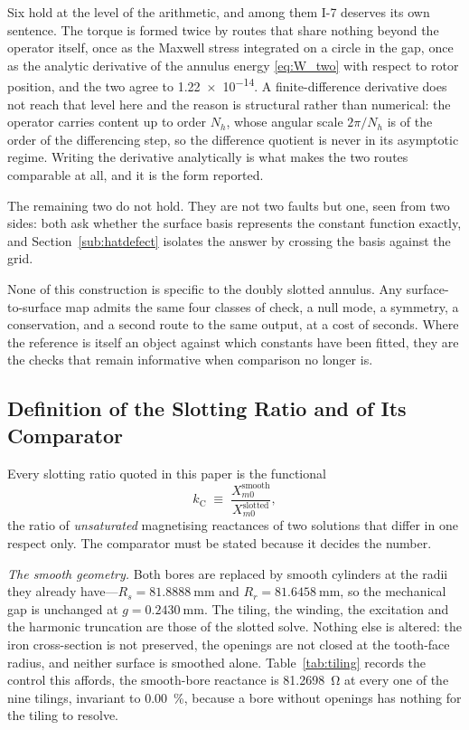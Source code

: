 \documentclass[10pt,a4paper,twocolumn]{article}
\theoremstyle{plain}
\theoremstyle{remark}
\begin{document}
Six hold at the level of the arithmetic, and among them I-7 deserves its
own sentence. The torque is formed twice by routes that share nothing
beyond the operator itself, once as the Maxwell stress integrated on a
circle in the gap, once as the analytic derivative of the annulus energy
\eqref{eq:W_two} with respect to rotor position, and the two agree to
\num{1.22e-14}. A finite-difference derivative does not reach that level
here and the reason is structural rather than numerical: the operator
carries content up to order $N_h$, whose angular scale $2\pi/N_h$ is of
the order of the differencing step, so the difference quotient is never
in its asymptotic regime. Writing the derivative analytically is what
makes the two routes comparable at all, and it is the form reported.

The remaining two do not hold. They are not two faults but one, seen
from two sides: both ask whether the surface basis represents the
constant function exactly, and Section~\ref{sub:hatdefect} isolates the
answer by crossing the basis against the grid.

None of this construction is specific to the doubly slotted annulus. Any
surface-to-surface map admits the same four classes of check, a null
mode, a symmetry, a conservation, and a second route to the same
output, at a cost of seconds. Where the reference is itself an object
against which constants have been fitted, they are the checks that remain
informative when comparison no longer is.

\subsection{Definition of the Slotting Ratio and of Its Comparator}
\label{sub:kcdef}

Every slotting ratio quoted in this paper is the functional
\begin{equation}
k_{\mathrm{C}}\;\equiv\;
\frac{X_{m0}^{\text{smooth}}}{X_{m0}^{\text{slotted}}},
\label{eq:kcdef}
\end{equation}
the ratio of \emph{unsaturated} magnetising reactances of two solutions
that differ in one respect only. The comparator must be stated because
it decides the number.

\emph{The smooth geometry.} Both bores are replaced by smooth cylinders
at the radii they already have---$R_s=\SI{81.8888}{\milli\metre}$ and
$R_r=\SI{81.6458}{\milli\metre}$, so the mechanical gap is unchanged at
$g=\SI{0.2430}{\milli\metre}$. The tiling, the winding, the excitation
and the harmonic truncation are those of the slotted solve. Nothing else
is altered: the iron cross-section is not preserved, the openings are
not closed at the tooth-face radius, and neither surface is smoothed
alone. Table~\ref{tab:tiling} records the control this affords, the
smooth-bore reactance is \SI{81.2698}{\ohm} at every one of the nine
tilings, invariant to \SI{0.00}{\percent}, because a bore without
openings has nothing for the tiling to resolve.
\end{document}
